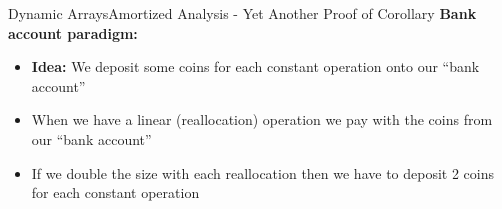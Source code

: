 
\begin{frame}{Dynamic Arrays}{Amortized Analysis -
    Yet Another Proof of Corollary}
  \textbf{Bank account paradigm:}
  \begin{itemize}
    \item
      \textbf{Idea:}
      We deposit some coins for each constant operation onto our
      \enquote{bank account}
    \item
      When we have a linear (reallocation) operation we pay with the coins
      from our \enquote{bank account}
    \item
      If we double the size with each reallocation then we have to deposit
      2 coins for each constant operation
  \end{itemize}
\end{frame}


